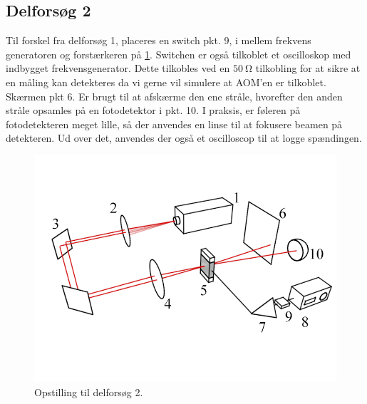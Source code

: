 \documentclass[main]{subfiles}
\begin{document}
\subsection{Delforsøg 2}
Til forskel fra delforsøg 1, placeres en switch pkt. 9, i mellem frekvens generatoren og forstærkeren på \cref{fig:opstilling2}. Switchen er også tilkoblet et oscilloskop med indbygget frekvensgenerator. Dette tilkobles ved en $\SI{50}{\ohm}$ tilkobling for at sikre at en måling kan detekteres da vi gerne vil simulere at AOM'en er tilkoblet.  Skærmen pkt 6. Er brugt til at afskærme den ene stråle, hvorefter den anden stråle opsamles på en fotodetektor i pkt. 10. I praksis, er føleren på fotodetekteren meget lille, så der anvendes en linse til at fokusere beamen på detekteren. Ud over det, anvendes der også et oscilloscop til at logge spændingen.

\begin{figure}[H]
    \centering
    \includegraphics[width=\linewidth]{tegninger/tegning2.png}
    \caption{Opstilling til delforsøg 2.}
    \label{fig:opstilling2}
\end{figure}
\end{document}
